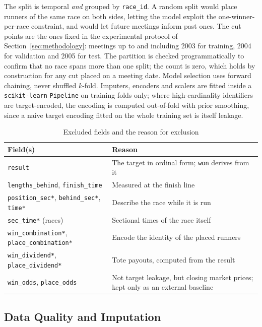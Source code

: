 The split is temporal \emph{and} grouped by \texttt{race\_id}. A random
split would place runners of the same race on both sides, letting the
model exploit the one-winner-per-race constraint, and would let future
meetings inform past ones. The cut points are the ones fixed in the
experimental protocol of Section~\ref{sec:methodology}: meetings up to and
including 2003 for training, 2004 for validation and 2005 for test. The
partition is checked programmatically to confirm that no race spans more
than one split; the count is zero, which holds by construction for any cut
placed on a meeting date.
Model selection uses forward chaining, never shuffled $k$-fold. Imputers,
encoders and scalers are fitted inside a \texttt{scikit-learn}
\texttt{Pipeline} on training folds only; where
high-cardinality identifiers are target-encoded, the encoding is computed
out-of-fold with prior smoothing, since a naive target encoding fitted on
the whole training set is itself leakage.

\begin{table}[!t]
\centering
\caption{Excluded fields and the reason for exclusion}
\label{tab:leakage}
\scriptsize
\renewcommand{\arraystretch}{1.2}
\begin{tabular}{@{}p{2.5cm} p{5.1cm}@{}}
\toprule
\textbf{Field(s)} & \textbf{Reason} \\
\midrule
\texttt{result} & The target in ordinal form; \texttt{won} derives from it \\
\texttt{lengths\_behind}, \texttt{finish\_time} & Measured at the finish line \\
\texttt{position\_sec*}, \texttt{behind\_sec*}, \texttt{time*} & Describe the race while it is run \\
\texttt{sec\_time*} (races) & Sectional times of the race itself \\
\texttt{win\_combination*}, \texttt{place\_combination*} & Encode the identity of the placed runners \\
\texttt{win\_dividend*}, \texttt{place\_dividend*} & Tote payouts, computed from the result \\
\midrule
\texttt{win\_odds}, \texttt{place\_odds} & Not target leakage, but closing market prices; kept only as an external baseline \\
\bottomrule
\end{tabular}
\end{table}

\subsection{Data Quality and Imputation}
\label{sec:quality}

